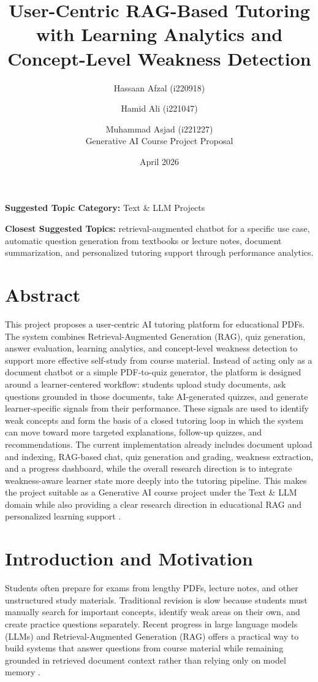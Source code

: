 \documentclass[11pt,a4paper]{article}
\title{\textbf{User-Centric RAG-Based Tutoring with Learning Analytics and Concept-Level Weakness Detection}}
\author{
    Hassaan Afzal (i220918) \and Hamid Ali (i221047) \and Muhammad Asjad (i221227) \\
    \normalsize Generative AI Course Project Proposal
}
\date{April 2026}
\begin{document}
\maketitle

\noindent \textbf{Suggested Topic Category:} Text \& LLM Projects

\noindent \textbf{Closest Suggested Topics:} retrieval-augmented chatbot for a specific use case, automatic question generation from textbooks or lecture notes, document summarization, and personalized tutoring support through performance analytics.

\section{Abstract}
This project proposes a user-centric AI tutoring platform for educational PDFs. The system combines Retrieval-Augmented Generation (RAG), quiz generation, answer evaluation, learning analytics, and concept-level weakness detection to support more effective self-study from course material. Instead of acting only as a document chatbot or a simple PDF-to-quiz generator, the platform is designed around a learner-centered workflow: students upload study documents, ask questions grounded in those documents, take AI-generated quizzes, and generate learner-specific signals from their performance. These signals are used to identify weak concepts and form the basis of a closed tutoring loop in which the system can move toward more targeted explanations, follow-up quizzes, and recommendations. The current implementation already includes document upload and indexing, RAG-based chat, quiz generation and grading, weakness extraction, and a progress dashboard, while the overall research direction is to integrate weakness-aware learner state more deeply into the tutoring pipeline. This makes the project suitable as a Generative AI course project under the Text \& LLM domain while also providing a clear research direction in educational RAG and personalized learning support \cite{nye2023dialog,levonian2023ragmath,han2024tutoringrag,kurulkar2025quizrag,li2025tutorllm,reddig2025feedback,naseer2025adaptive,swacha2025survey}.

\section{Introduction and Motivation}
Students often prepare for exams from lengthy PDFs, lecture notes, and other unstructured study materials. Traditional revision is slow because students must manually search for important concepts, identify weak areas on their own, and create practice questions separately. Recent progress in large language models (LLMs) and Retrieval-Augmented Generation (RAG) offers a practical way to build systems that answer questions from course material while remaining grounded in retrieved document context rather than relying only on model memory \cite{levonian2023ragmath,han2024tutoringrag,swacha2025survey}.
\end{document}
